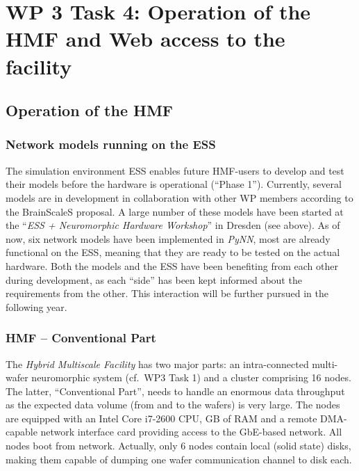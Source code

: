 \documentclass[12pt,oneside]{scrartcl}
\begin{document}
\section*{WP 3 Task 4: Operation of the HMF and Web access to the facility}


%


\subsection*{Operation of the HMF}

\subsubsection*{Network models running on the ESS}

The simulation environment ESS enables future HMF-users to develop and test their models before the hardware is operational (``Phase 1'').
%
Currently, several models are in development in collaboration with other WP members according to the BrainScaleS proposal.
%
A large number of these models have been started at the ``\emph{ESS + Neuromorphic Hardware Workshop}'' in Dresden (see above).
%
As of now, six network models have been implemented in \emph{PyNN}, most are already functional on the ESS, meaning that they are ready to be tested on the actual hardware.
%
Both the models and the ESS have been benefiting from each other during development, as each ``side'' has been kept informed about the requirements from the other.
%
This interaction will be further pursued in the following year.

\subsubsection*{HMF -- Conventional Part}

The \emph{Hybrid Multiscale Facility} has two major parts:
%
an intra-connected multi-wafer neuromorphic system (cf.\ WP3 Task 1) and a cluster comprising 16 nodes.
%
The latter, ``Conventional Part'', needs to handle an enormous data throughput as the expected data volume (from and to the wafers) is very large.
%
The nodes are equipped with an Intel Core i7-2600 CPU, \unit[16]{GB} of RAM and a remote DMA-capable network interface card providing access to the \unit[10]{GbE}-based network.
%
All nodes boot from network.
%
Actually, only 6 nodes contain local (solid state) disks, making them capable of dumping one wafer communication channel to disk each.
\end{document}
